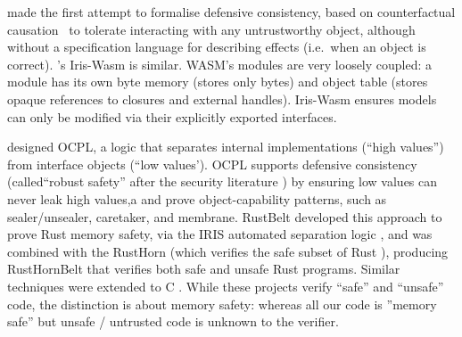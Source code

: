  
\citet{Murray10dphil} made the first attempt to formalise defensive
consistency, based on counterfactual causation~\cite{Lewis_73}
to tolerate interacting with any untrustworthy object,
although
without a specification language for describing effects
(i.e.\ when an object is correct).
%
%
\citet{iris-wasm-pldi2023}'s Iris-Wasm is similar.
WASM's
modules are very loosely coupled: a module
has its own byte memory
(stores only bytes) 
and object table
(stores opaque references to closures and external handles).
%
%
Iris-Wasm ensures models 
can only be
modified via their explicitly exported interfaces.

\citet{ddd}  designed OCPL, a logic
that separates internal implementations (``high values'')
from interface objects
(``low values'). %
OCPL supports defensive
consistency %
(called``robust safety'' after the
security literature \cite{Bengtson})
by ensuring
low values can never leak high values,a %
and 
prove %
object-capability patterns, such as
sealer/unsealer, caretaker, and membrane.
%
%
RustBelt \cite{RustBelt18}
developed this approach to prove Rust memory safety,
via the IRIS automated
separation logic \cite{iris-jfp2018},
%
%
and was combined 
with the RustHorn  %
(which verifies the safe subset of Rust \cite{RustHorn-toplas2021}),
producing RustHornBelt \cite{RustHornBelt-pldi2022} that verifies
both safe and unsafe Rust programs.%
Similar techniques were extended to C \cite{RefinedC-pldi2021}.
While these projects 
verify ``safe'' and ``unsafe'' code, 
%
the distinction is about memory safety:%
%
%
%
whereas all our code is ''memory safe''
but unsafe / untrusted code is unknown to the verifier.

